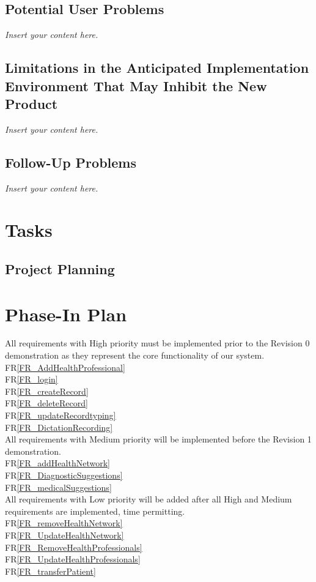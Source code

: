 \documentclass[12pt]{article}
\newcommand{\lips}{\textit{Insert your content here.}}
\begin{document}
\subsection{Potential User Problems}
\lips
\subsection{Limitations in the Anticipated Implementation Environment That May
Inhibit the New Product}
\lips
\subsection{Follow-Up Problems}
\lips

\section{Tasks}
\subsection{Project Planning}


\section{Phase-In Plan}

All requirements with High priority must be implemented prior to the Revision 0 demonstration as they represent the core functionality of our system.\\
FR\ref{FR_AddHealthProfessional}\\
FR\ref{FR_login}\\
FR\ref{FR_createRecord}\\
FR\ref{FR_deleteRecord}\\
FR\ref{FR_updateRecordtyping}\\ 
FR\ref{FR_DictationRecording}\\

All requirements with Medium priority will be implemented before the Revision 1 demonstration.\\
FR\ref{FR_addHealthNetwork}\\
FR\ref{FR_DiagnosticSuggestions}\\
FR\ref{FR_medicalSuggestions}\\

All requirements with Low priority will be added after all High and Medium requirements are implemented, time permitting.\\
FR\ref{FR_removeHealthNetwork}\\
FR\ref{FR_UpdateHealthNetwork}\\
FR\ref{FR_RemoveHealthProfessionals}\\
FR\ref{FR_UpdateHealthProfessionals}\\ 
FR\ref{FR_transferPatient}\\
\end{document}
